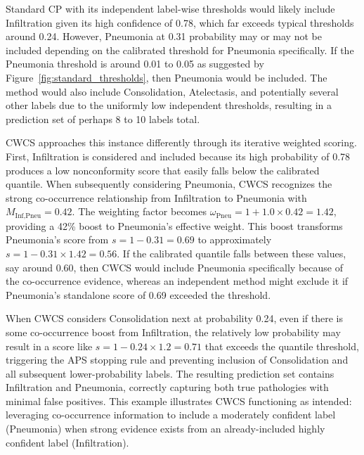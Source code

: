 Standard CP with its independent label-wise thresholds would likely include Infiltration given its high confidence of 0.78, which far exceeds typical thresholds around 0.24.
However, Pneumonia at 0.31 probability may or may not be included depending on the calibrated threshold for Pneumonia specifically.
If the Pneumonia threshold is around 0.01 to 0.05 as suggested by Figure~\ref{fig:standard_thresholds}, then Pneumonia would be included.
The method would also include Consolidation, Atelectasis, and potentially several other labels due to the uniformly low independent thresholds, resulting in a prediction set of perhaps 8 to 10 labels total.

CWCS approaches this instance differently through its iterative weighted scoring.
First, Infiltration is considered and included because its high probability of 0.78 produces a low nonconformity score that easily falls below the calibrated quantile.
When subsequently considering Pneumonia, CWCS recognizes the strong co-occurrence relationship from Infiltration to Pneumonia with $M_{\text{Inf},\text{Pneu}} = 0.42$.
The weighting factor becomes $\omega_{\text{Pneu}} = 1 + 1.0 \times 0.42 = 1.42$, providing a 42\% boost to Pneumonia's effective weight.
This boost transforms Pneumonia's score from $s = 1 - 0.31 = 0.69$ to approximately $s = 1 - 0.31 \times 1.42 = 0.56$.
If the calibrated quantile falls between these values, say around 0.60, then CWCS would include Pneumonia specifically because of the co-occurrence evidence, whereas an independent method might exclude it if Pneumonia's standalone score of 0.69 exceeded the threshold.

When CWCS considers Consolidation next at probability 0.24, even if there is some co-occurrence boost from Infiltration, the relatively low probability may result in a score like $s = 1 - 0.24 \times 1.2 = 0.71$ that exceeds the quantile threshold, triggering the APS stopping rule and preventing inclusion of Consolidation and all subsequent lower-probability labels.
The resulting prediction set contains Infiltration and Pneumonia, correctly capturing both true pathologies with minimal false positives.
This example illustrates CWCS functioning as intended: leveraging co-occurrence information to include a moderately confident label (Pneumonia) when strong evidence exists from an already-included highly confident label (Infiltration).

